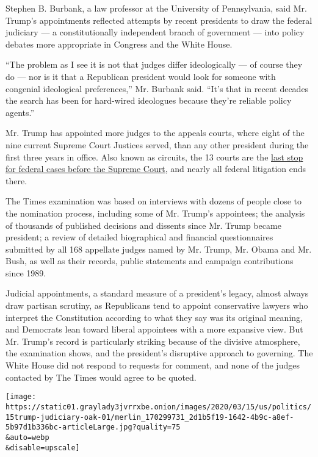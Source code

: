 Stephen B. Burbank, a law professor at the University of Pennsylvania,
said Mr. Trump's appointments reflected attempts by recent presidents to
draw the federal judiciary --- a constitutionally independent branch of
government --- into policy debates more appropriate in Congress and the
White House.

``The problem as I see it is not that judges differ ideologically --- of
course they do --- nor is it that a Republican president would look for
someone with congenial ideological preferences,'' Mr. Burbank said.
``It's that in recent decades the search has been for hard-wired
ideologues because they're reliable policy agents.''

Mr. Trump has appointed more judges to the appeals courts, where eight
of the nine current Supreme Court Justices served, than any other
president during the first three years in office. Also known as
circuits, the 13 courts are the
\href{https://www.uscourts.gov/statistics-reports/appellate-courts-and-cases-journalists-guide}{last
stop for federal cases before the Supreme Court,} and nearly all federal
litigation ends there.

The Times examination was based on interviews with dozens of people
close to the nomination process, including some of Mr. Trump's
appointees; the analysis of thousands of published decisions and
dissents since Mr. Trump became president; a review of detailed
biographical and financial questionnaires submitted by all 168 appellate
judges named by Mr. Trump, Mr. Obama and Mr. Bush, as well as their
records, public statements and campaign contributions since 1989.

Judicial appointments, a standard measure of a president's legacy,
almost always draw partisan scrutiny, as Republicans tend to appoint
conservative lawyers who interpret the Constitution according to what
they say was its original meaning, and Democrats lean toward liberal
appointees with a more expansive view. But Mr. Trump's record is
particularly striking because of the divisive atmosphere, the
examination shows, and the president's disruptive approach to governing.
The White House did not respond to requests for comment, and none of the
judges contacted by The Times would agree to be quoted.

\texttt{[image: https://static01.graylady3jvrrxbe.onion/images/2020/03/15/us/politics/15trump-judiciary-oak-01/merlin\_170299731\_2d1b5f19-1642-4b9c-a8ef-5b97d1b336bc-articleLarge.jpg?quality=75\\\&auto=webp\\\&disable=upscale]}

